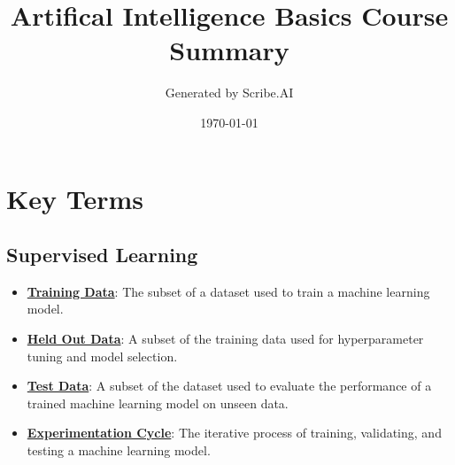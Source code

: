 \documentclass{article}%
\title{Artifical Intelligence Basics Course Summary}%
\author{Generated by Scribe.AI}%
\date{\today}%
\begin{document}
%
\normalsize%
\maketitle%
\section{Key Terms}%
\label{sec:KeyTerms}%
\subsection{Supervised Learning}%
\label{subsec:SupervisedLearning}%
\begin{itemize}[leftmargin=*]%
\item \href{https://purdue.brightspace.com/d2l/common/assets/pdfjs-d2l-dist/1.0.14-legacy/web/viewer.html?file=\%2Fcontent\%2Fenforced\%2F1095467-wl.202510.CS.24300.001\%2F10L1-CrossValidation.pdf\%3Fou\%3D1095467\&lang=en-us\&container=d2l-fileviewer-rendered-pdf\&fullscreen=d2l-fileviewer-rendered-pdf-dialog\&height=667#page=6}{\textbf{Training Data}}: The subset of a dataset used to train a machine learning model.%
\item \href{https://purdue.brightspace.com/d2l/common/assets/pdfjs-d2l-dist/1.0.14-legacy/web/viewer.html?file=\%2Fcontent\%2Fenforced\%2F1095467-wl.202510.CS.24300.001\%2F10L1-CrossValidation.pdf\%3Fou\%3D1095467\&lang=en-us\&container=d2l-fileviewer-rendered-pdf\&fullscreen=d2l-fileviewer-rendered-pdf-dialog\&height=667#page=6}{\textbf{Held Out Data}}: A subset of the training data used for hyperparameter tuning and model selection.%
\item \href{https://purdue.brightspace.com/d2l/common/assets/pdfjs-d2l-dist/1.0.14-legacy/web/viewer.html?file=\%2Fcontent\%2Fenforced\%2F1095467-wl.202510.CS.24300.001\%2F10L1-CrossValidation.pdf\%3Fou\%3D1095467\&lang=en-us\&container=d2l-fileviewer-rendered-pdf\&fullscreen=d2l-fileviewer-rendered-pdf-dialog\&height=667#page=6}{\textbf{Test Data}}: A subset of the dataset used to evaluate the performance of a trained machine learning model on unseen data.%
\item \href{https://purdue.brightspace.com/d2l/common/assets/pdfjs-d2l-dist/1.0.14-legacy/web/viewer.html?file=\%2Fcontent\%2Fenforced\%2F1095467-wl.202510.CS.24300.001\%2F10L1-CrossValidation.pdf\%3Fou\%3D1095467\&lang=en-us\&container=d2l-fileviewer-rendered-pdf\&fullscreen=d2l-fileviewer-rendered-pdf-dialog\&height=667#page=6}{\textbf{Experimentation Cycle}}: The iterative process of training, validating, and testing a machine learning model.%

\end{itemize}
\end{document}
